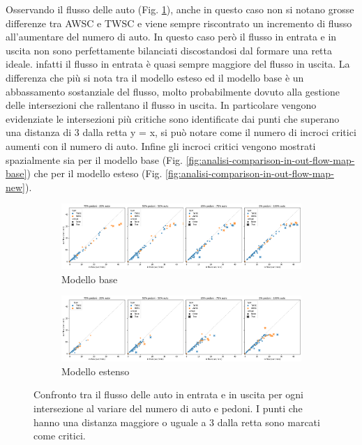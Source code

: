 \pagebreak

Osservando il flusso delle auto (Fig. \ref{fig:analisi-comparison-in-out-flow-car}), anche in questo caso
non si notano grosse differenze tra AWSC e TWSC e viene sempre riscontrato un incremento di flusso all'aumentare del numero di auto.
In questo caso però il flusso in entrata e in uscita non sono perfettamente bilanciati discostandosi dal formare una retta ideale.
infatti il flusso in entrata è quasi sempre maggiore del flusso in uscita.
La differenza che più si nota tra il modello esteso ed il modello base è un abbassamento sostanziale del flusso,
molto probabilmente dovuto alla gestione delle intersezioni che rallentano il flusso in uscita.
In particolare vengono evidenziate le intersezioni più critiche sono identificate dai punti che superano una distanza di 3 dalla retta y = x,
si può notare come il numero di incroci critici aumenti con il numero di auto.
Infine gli incroci critici vengono mostrati spazialmente sia per il modello base (Fig. \ref{fig:analisi-comparison-in-out-flow-map-base})
che per il modello esteso (Fig. \ref{fig:analisi-comparison-in-out-flow-map-new}).

\begin{figure}[ht]
    \centering
    \begin{subfigure}{0.9\textwidth}
        \centering
        \includegraphics[width=\textwidth]{images/analisi/comparison-base-in-out-flow-car.png}
        \caption{Modello base}
    \end{subfigure}
    \hfill
    \begin{subfigure}{0.9\textwidth}
        \centering
        \includegraphics[width=\textwidth]{images/analisi/comparison-new-in-out-flow-car.png}
        \caption{Modello estenso}
    \end{subfigure}
    \caption{
        Confronto tra il flusso delle auto in entrata e in uscita per ogni intersezione al variare del numero di auto e pedoni.
        I punti che hanno una distanza maggiore o uguale a 3 dalla retta sono marcati come critici.
    }
    \label{fig:analisi-comparison-in-out-flow-car}
\end{figure}

